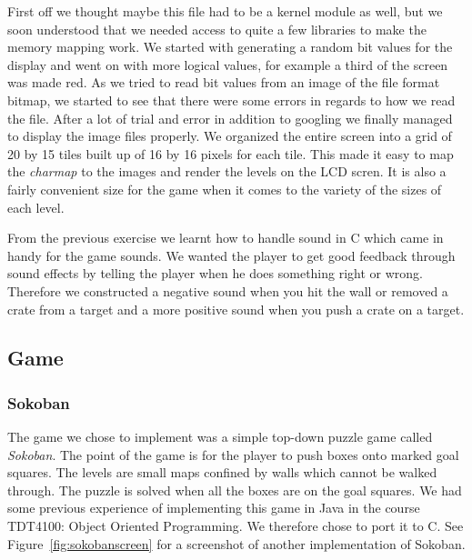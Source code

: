 \documentclass[a4paper,11pt]{article}
\begin{document}
First off we thought maybe this file had to be a kernel module as well, but we soon understood that we needed access to quite a few libraries to make the memory mapping work. We started with generating a random bit values for the display and went on with more logical values, for example a third of the screen was made red. As we tried to read bit values from an image of the file format bitmap, we started to see that there were some errors in regards to how we read the file. After a lot of trial and error in addition to googling we finally managed to display the image files properly. We organized the entire screen into a grid of 20 by 15 tiles built up of 16 by 16 pixels for each tile. This made it easy to map the \textit{charmap} to the images and render the levels on the LCD scren. It is also a fairly convenient size for the game when it comes to the variety of the sizes of each level.

From the previous exercise we learnt how to handle sound in C which came in handy for the game sounds. We wanted the player to get good feedback through sound effects by telling the player when he does something right or wrong. Therefore we constructed a negative sound when you hit the wall or removed a crate from a target and a more positive sound when you push a crate on a target. 


\subsection{Game}
\subsubsection{Sokoban}
The game we chose to implement was a simple top-down puzzle game called \textit{Sokoban}\cite{sokoban}. The point of the game is for the player to push boxes onto marked goal squares. The levels are small maps confined by walls which cannot be walked through. The puzzle is solved when all the boxes are on the goal squares. We had some previous experience of implementing this game in Java in the course TDT4100: Object Oriented Programming. We therefore chose to port it to C. See Figure~\ref{fig:sokobanscreen} for a screenshot of another implementation of Sokoban.
\end{document}
